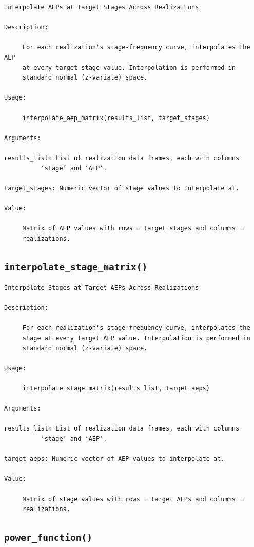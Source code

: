\documentclass[
  letterpaper,
  DIV=11,
  numbers=noendperiod]{scrreprt}
\begin{document}
\begin{verbatim}
Interpolate AEPs at Target Stages Across Realizations

Description:

     For each realization's stage-frequency curve, interpolates the AEP
     at every target stage value. Interpolation is performed in
     standard normal (z-variate) space.

Usage:

     interpolate_aep_matrix(results_list, target_stages)
     
Arguments:

results_list: List of realization data frames, each with columns
          ‘stage’ and ‘AEP’.

target_stages: Numeric vector of stage values to interpolate at.

Value:

     Matrix of AEP values with rows = target stages and columns =
     realizations.
\end{verbatim}

\subsection{\texorpdfstring{\texttt{interpolate\_stage\_matrix()}}{interpolate\_stage\_matrix()}}\label{interpolate_stage_matrix}

\begin{verbatim}
Interpolate Stages at Target AEPs Across Realizations

Description:

     For each realization's stage-frequency curve, interpolates the
     stage at every target AEP value. Interpolation is performed in
     standard normal (z-variate) space.

Usage:

     interpolate_stage_matrix(results_list, target_aeps)
     
Arguments:

results_list: List of realization data frames, each with columns
          ‘stage’ and ‘AEP’.

target_aeps: Numeric vector of AEP values to interpolate at.

Value:

     Matrix of stage values with rows = target AEPs and columns =
     realizations.
\end{verbatim}

\subsection{\texorpdfstring{\texttt{power\_function()}}{power\_function()}}\label{power_function}
\end{document}

